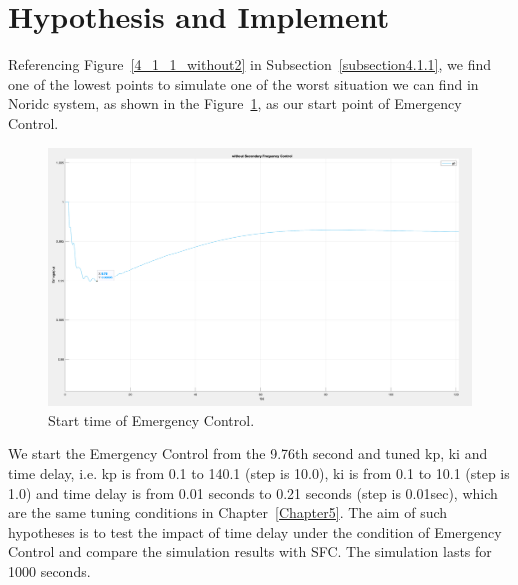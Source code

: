 \section{Hypothesis and Implement} %
Referencing Figure~\ref{4_1_1_without2} in Subsection~\ref{subsection4.1.1}, we find one of the lowest points to simulate one of the worst situation we can find in Noridc system, as shown in the Figure~\ref{6_2_g9}, as our start point of Emergency Control.

\begin{figure}[htbp]
\centering
\includegraphics[width = .819\textwidth]{figure/6_2_g9.png}
\caption{Start time of Emergency Control.}
\label{6_2_g9}
\end{figure}

We start the Emergency Control from the 9.76th second and tuned kp, ki and time delay, i.e. kp is from 0.1 to 140.1 (step is 10.0), ki is from 0.1 to 10.1 (step is 1.0) and time delay is from 0.01 seconds to 0.21 seconds (step is 0.01sec), which are the same tuning conditions in Chapter~\ref{Chapter5}. The aim of such hypotheses is to test the impact of time delay under the condition of Emergency Control and compare the simulation results with SFC. The simulation lasts for 1000 seconds. 